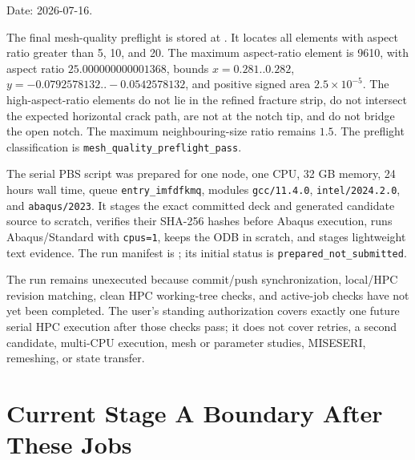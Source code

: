 \documentclass[11pt,a4paper]{article}
\begin{document}
Date: 2026-07-16.

The final mesh-quality preflight is stored at . It locates all elements with aspect ratio greater than 5, 10, and 20. The maximum aspect-ratio element is 9610, with aspect ratio \(25.000000000001368\), bounds \(x=0.281..0.282\), \(y=-0.0792578132..-0.0542578132\), and positive signed area \(2.5\times10^{-5}\). The high-aspect-ratio elements do not lie in the refined fracture strip, do not intersect the expected horizontal crack path, are not at the notch tip, and do not bridge the open notch. The maximum neighbouring-size ratio remains \(1.5\). The preflight classification is \texttt{mesh\_quality\_preflight\_pass}.

The serial PBS script  was prepared for one node, one CPU, 32 GB memory, 24 hours wall time, queue \texttt{entry\_imfdfkmq}, modules \texttt{gcc/11.4.0}, \texttt{intel/2024.2.0}, and \texttt{abaqus/2023}. It stages the exact committed deck and generated candidate source to scratch, verifies their SHA-256 hashes before Abaqus execution, runs Abaqus/Standard with \texttt{cpus=1}, keeps the ODB in scratch, and stages lightweight text evidence. The run manifest is ; its initial status is \texttt{prepared\_not\_submitted}.

The run remains unexecuted because commit/push synchronization, local/HPC revision matching, clean HPC working-tree checks, and active-job checks have not yet been completed. The user's standing authorization covers exactly one future serial HPC execution after those checks pass; it does not cover retries, a second candidate, multi-CPU execution, mesh or parameter studies, MISESERI, remeshing, or state transfer.

\section{Current Stage A Boundary After These Jobs}
\end{document}
